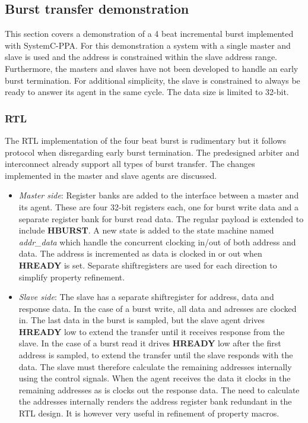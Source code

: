 \subsection{Burst transfer demonstration} 
\label{sub:burstdemo}
This section covers a demonstration of a 4 beat incremental burst implemented with SystemC-PPA. For this demonstration a system with a single master and slave
is used and the address is constrained within the slave address range. Furthermore, the masters and slaves have not been developed to handle an early burst termination. For additional simplicity, the slave is constrained to always be ready to answer its agent in the same cycle. The data size is limited to 32-bit.

\subsubsection{RTL}
The RTL implementation of the four beat burst is rudimentary but it follows protocol when disregarding early burst termination. The predesigned arbiter and interconnect already support all types of burst transfer. The changes implemented in the master and slave agents are discussed.
\begin{itemize}
 \item \textit{Master side}: Register banks are added to the interface between a master and its agent. These are four 32-bit registers each, one for burst write data and a separate register bank for burst read data. The regular payload is extended to include \textbf{HBURST}. A new state is added to the state machine named \textit{addr\_data} which handle the concurrent clocking in/out of both address and data. The address is incremented as data is clocked in or out when \textbf{HREADY} is set. Separate shiftregisters are used for each direction to simplify property refinement. 
 \item \textit{Slave side}: The slave has a separate shiftregister for address, data and response data. In the case of a burst write, all data and adresses are clocked in. The last data in the burst is sampled, but the slave agent drives \textbf{HREADY} low to extend the transfer until it receives response from the slave. In the case of a burst read it drives \textbf{HREADY} low after the first address is sampled, to extend the transfer until the slave responds with the data. The slave must therefore calculate the remaining addresses internally using the control signals. When the agent receives the data it clocks in the remaining addresses as is clocks out the response data. The need to calculate the addresses internally renders the address register bank redundant in the RTL design. It is however very useful in refinement of property macros. 
\end{itemize}

